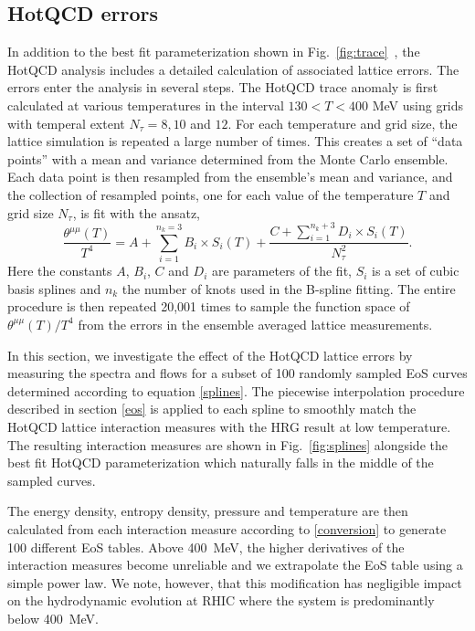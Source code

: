 \documentclass[aps,prc,reprint,amsmath,nofootinbib,superscriptaddress]{revtex4-1}
\begin{document}
\subsection{HotQCD errors}
\label{errors}

In addition to the best fit parameterization shown in Fig.~\ref{fig:trace}~, the HotQCD analysis includes a detailed calculation of associated lattice errors. The errors enter the analysis in several steps.
The HotQCD trace anomaly is first calculated at various temperatures in the interval $130 < T < 400$ MeV using grids with temperal extent $N_\tau = 8,10$ and $12$.
For each temperature and grid size, the lattice simulation is repeated a large number of times. 
This creates a set of ``data points'' with a mean and variance determined from the Monte Carlo ensemble. 
Each data point is then resampled from the ensemble's mean and variance, and the collection of resampled points, one for each value of the temperature $T$ and grid size $N_\tau$, is fit with the ansatz,
\begin{equation}
 \label{splines}
 \frac{\theta^{\mu\mu}(T)}{T^4} = A + \sum\limits_{i=1}^{n_k=3} B_i \times S_i(T) + \frac{C + \sum_{i=1}^{n_k + 3} D_i \times S_i(T)}{N_\tau^2}.
\end{equation}
Here the constants $A$, $B_i$, $C$ and $D_i$ are parameters of the fit, $S_i$ is a set of cubic basis splines and $n_k$ the number of knots used in the B-spline fitting. 
The entire procedure is then repeated 20,001 times to sample the function space of $\theta^{\mu\mu}(T)/T^4$ from the errors in the ensemble averaged lattice measurements.

In this section, we investigate the effect of the HotQCD lattice errors by measuring the spectra and flows for a subset of 100 randomly sampled EoS curves determined according to equation \eqref{splines}.
The piecewise interpolation procedure described in section \ref{eos} is applied to each spline to smoothly match the HotQCD lattice interaction measures with the HRG result at low temperature. 
The resulting interaction measures are shown in Fig.~\ref{fig:splines} alongside the best fit HotQCD parameterization which naturally falls in the middle of the sampled curves.  

The energy density, entropy density, pressure and temperature are then calculated from each interaction measure according to \eqref{conversion} to generate 100 different EoS tables. 
Above 400~MeV, the higher derivatives of the interaction measures become unreliable and we extrapolate the EoS table using a simple power law. 
We note, however, that this modification has negligible impact on the hydrodynamic evolution at RHIC where the system is predominantly below 400~MeV.
\end{document}
